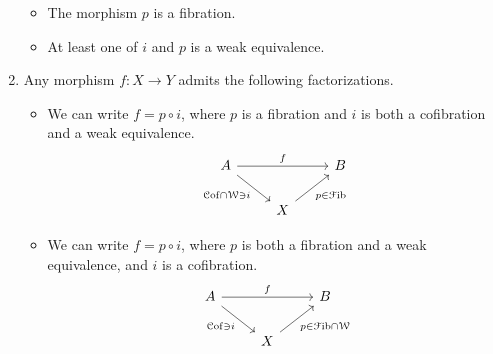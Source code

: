 \documentclass[main.tex]{subfiles}
\begin{document}
\begin{definition}
\begin{enumerate}[label=(M\arabic*)]
\begin{itemize}
        \item The morphism $p$ is a fibration.

        \item At least one of $i$ and $p$ is a weak equivalence.
      \end{itemize}

    \item\label{item:MC_morphisms_factorize} Any morphism $f\colon X \to Y$ admits the following factorizations.
      \begin{itemize}
        \item We can write $f = p \circ i$, where $p$ is a fibration and $i$ is both a cofibration and a weak equivalence.
          \begin{equation*}
            \begin{tikzcd}
              A
              \arrow[rr, "f"]
              \arrow[dr, swap, "\cof \cap \W \ni i"]
              && B
              \\
              & X
              \arrow[ur, swap, "p \in \fib"]
            \end{tikzcd}
          \end{equation*}

        \item We can write $f = p \circ i$, where $p$ is both a fibration and a weak equivalence, and $i$ is a cofibration.
          \begin{equation*}
            \begin{tikzcd}
              A
              \arrow[rr, "f"]
              \arrow[dr, swap, "\cof \ni i"]
              && B
              \\
              & X
              \arrow[ur, swap, "p \in \fib \cap \W"]
            \end{tikzcd}
          \end{equation*}
      \end{itemize}
  \end{enumerate}
\end{definition}
\end{document}

